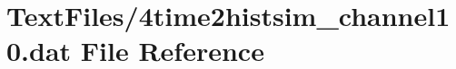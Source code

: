 \hypertarget{4time2histsim__channel10_8dat}{}\section{Text\+Files/4time2histsim\+\_\+channel10.dat File Reference}
\label{4time2histsim__channel10_8dat}
